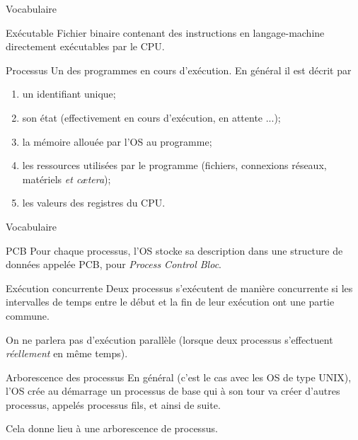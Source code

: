 \documentclass[10pt]{nsibeamer}
\begin{document}
\begin{frame}{Vocabulaire}\pause
\begin{block}{Exécutable}
Fichier binaire contenant des instructions en langage-machine directement exécutables par le CPU.
\end{block}\pause

\begin{block}{Processus}
Un des programmes en cours d'exécution. En général il est décrit par\pause
\begin{enumerate}[--]
	\item un \alert{identifiant} unique;\pause
    \item son \alert{état} (effectivement en cours d'exécution, en attente ...);\pause
    \item la \alert{mémoire} allouée par l'OS au programme;\pause
    \item les \alert{ressources} utilisées par le programme (fichiers, connexions réseaux, matériels \textit{et c\ae tera});\pause
    \item les \alert{valeurs des registres} du CPU.\pause
\end{enumerate}

\end{block}
\end{frame}
\begin{frame}{Vocabulaire}\pause
\begin{block}{PCB}
Pour chaque processus, l'OS stocke sa description dans une structure de données appelée \alert{PCB}, pour \textit{Process Control Bloc}.
\end{block}\pause


\begin{block}{Exécution concurrente}\pause
Deux processus s'exécutent de manière concurrente si les intervalles de temps entre le début et la fin de leur exécution ont une partie commune.
\end{block}\pause
On ne parlera pas d'exécution \alert{parallèle} (lorsque deux processus s'effectuent \textit{réellement} en même temps).
\end{frame}

\begin{frame}{Arborescence des processus}\pause
En général (c'est le cas avec les OS de type \textsc{UNIX}), l'OS crée au démarrage un processus de base qui à son tour va créer d'autres processus, appelés \alert{processus fils}, et ainsi de suite.\\\pause

Cela donne lieu à une \alert{arborescence de processus}.
\end{frame}
\end{document}
